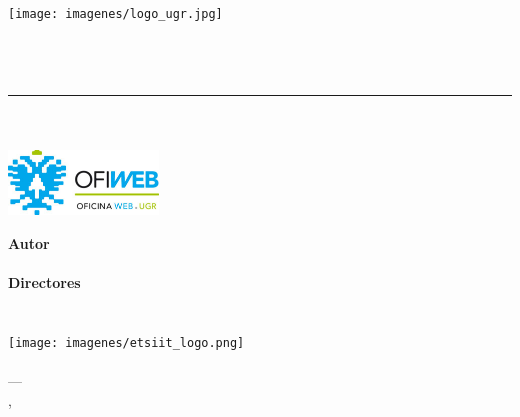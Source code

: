 \begin{titlepage}
 
 
\newlength{\centeroffset}
\setlength{\centeroffset}{-0.5\oddsidemargin}
\addtolength{\centeroffset}{0.5\evensidemargin}
\thispagestyle{empty}

\noindent\hspace*{\centeroffset}

\begin{minipage}{\textwidth}

\centering
\texttt{[image: imagenes/logo\_ugr.jpg]}\\[1.4cm]

\textsc{ \Large \MakeUppercase{\myDocument}\\[0.2cm]}
\textsc{ \MakeUppercase{\myDegree}}\\[1cm]
% 
{\Huge\bfseries \myTitle \\
}
\noindent\rule[-1ex]{\textwidth}{3pt}\\[3.5ex]
{\large\bfseries \myCompany}\\[0.6cm]
\includegraphics[width=0.3\textwidth]{imagenes/ofiweb.png}\\

\end{minipage}

\vspace{1cm}
\noindent\hspace*{\centeroffset}

\begin{minipage}{\textwidth}
\centering

\textbf{Autor}\\ {\myName}\\[2.5ex]
\textbf{Directores}\\
{\myProf\\
\myOtherProf}\\[1cm]
\texttt{[image: imagenes/etsiit\_logo.png]}\\[0.1cm]
\textsc{\myFacultyShort}\\
\textsc{---}\\
\myLocation, \myTime
\end{minipage}
\end{titlepage}


